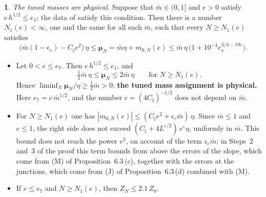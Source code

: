 \documentclass[11pt]{amsart}
\newcommand{\namedhead}{}
\theoremstyle{definition}
\newtheorem*{namedinner}{\namedhead}
\newenvironment{named}[1]{\renewcommand{\namedhead}{#1}\begin{namedinner}}{\end{namedinner}}
\begin{document}
\begin{named}{Theorem 6.1}
\emph{The tuned masses are physical.}
Suppose that $\bar m\in(0,1]$ and $e>0$ satisfy $e\,h^{1/2}\le e_1$; the data of \cite[Theorem~44]{QEDIII} satisfy this condition.
Then there is a number $N_1(e)<\infty$, one and the same for all such $\bar m$, such that every $N\ge N_1(e)$ satisfies
\begin{equation*}
\bigl(\bar m(1-\epsilon_e)-C_\natural e^2\bigr)\,\eta\le\boldsymbol\mu_N=\bar m\eta+m_{0,N}(e)\le\bar m\,\eta\,\bigl(1+10^{-4}e_\star^{3/4-10\varepsilon}\bigr).
\end{equation*}
\begin{itemize}
\item[(a)] Let $0<e\le e_7$.
Then $e\,h^{1/2}\le e_1$, and
\begin{equation*}
\tfrac12\bar m\,\eta\le\boldsymbol\mu_N\le2\bar m\,\eta\qquad\text{for }N\ge N_1(e).
\end{equation*}
Hence $\liminf_N\boldsymbol\mu_N/\eta\ge\frac12\bar m>0$: \textbf{the tuned mass assignment is physical.}
Here $e_7=c\,\bar m^{1/2}$, and the number $c=(4C_\natural)^{-1/2}$ does not depend on $\bar m$.
\item[(b)] For $N\ge N_1(e)$ one has $|m_{0,N}(e)|\le(C_\natural e^2+\epsilon_e\bar m)\,\eta$.
Since $\bar m\le1$ and $e\le1$, the right side does not exceed $(C_\natural+4L^{\varepsilon/2})\,e^{\varepsilon}\eta$, uniformly in $\bar m$.
This bound does not reach the power $e^2$, on account of the term $\epsilon_e\bar m$;
in Steps~2 and~3 of the proof this term bounds from above the errors of the slope, which come from (M) of Proposition~6.3\,(c), together with the errors at the junctions, which come from (J) of Proposition~6.3\,(d) combined with (M).
\item[(c)] If $e\le e_7$ and $N\ge N_1(e)$, then $Z_N\le2.1\,Z_0$.
\end{itemize}
\end{named}
\end{document}
